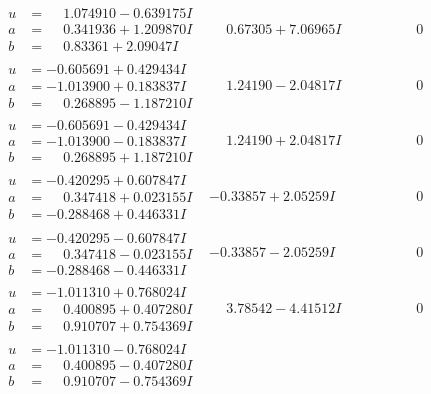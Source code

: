 \documentclass[1p]{elsarticle_modified}
\theoremstyle{definition}
\begin{document}
$$\begin{array}{c|c|c}
\begin{aligned}
u &= \phantom{-}1.074910 - 0.639175 I \\
a &= \phantom{-}0.341936 + 1.209870 I \\
b &= \phantom{-}0.83361 + 2.09047 I\end{aligned}
 & \phantom{-}0.67305 + 7.06965 I & \phantom{-0.000000 } 0 \\ \hline\begin{aligned}
u &= -0.605691 + 0.429434 I \\
a &= -1.013900 + 0.183837 I \\
b &= \phantom{-}0.268895 - 1.187210 I\end{aligned}
 & \phantom{-}1.24190 - 2.04817 I & \phantom{-0.000000 } 0 \\ \hline\begin{aligned}
u &= -0.605691 - 0.429434 I \\
a &= -1.013900 - 0.183837 I \\
b &= \phantom{-}0.268895 + 1.187210 I\end{aligned}
 & \phantom{-}1.24190 + 2.04817 I & \phantom{-0.000000 } 0 \\ \hline\begin{aligned}
u &= -0.420295 + 0.607847 I \\
a &= \phantom{-}0.347418 + 0.023155 I \\
b &= -0.288468 + 0.446331 I\end{aligned}
 & -0.33857 + 2.05259 I & \phantom{-0.000000 } 0 \\ \hline\begin{aligned}
u &= -0.420295 - 0.607847 I \\
a &= \phantom{-}0.347418 - 0.023155 I \\
b &= -0.288468 - 0.446331 I\end{aligned}
 & -0.33857 - 2.05259 I & \phantom{-0.000000 } 0 \\ \hline\begin{aligned}
u &= -1.011310 + 0.768024 I \\
a &= \phantom{-}0.400895 + 0.407280 I \\
b &= \phantom{-}0.910707 + 0.754369 I\end{aligned}
 & \phantom{-}3.78542 - 4.41512 I & \phantom{-0.000000 } 0 \\ \hline\begin{aligned}
u &= -1.011310 - 0.768024 I \\
a &= \phantom{-}0.400895 - 0.407280 I \\
b &= \phantom{-}0.910707 - 0.754369 I\end{aligned}

\end{array}$$
\end{document}

